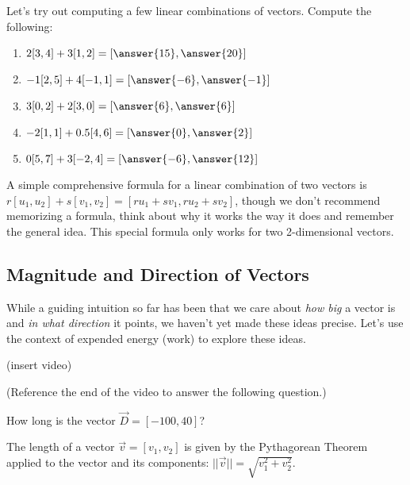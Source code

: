 \documentclass{ximera}
\begin{document}
\begin{problem}
    Let's try out computing a few linear combinations of vectors. Compute the following:
    \begin{enumerate}
        \item $2[3,4]+3[1,2]=[\answer{15},\answer{20}]$
        \item $-1[2,5]+4[-1,1]=[\answer{-6},\answer{-1}]$
        \item $3[0,2]+2[3,0]=[\answer{6},\answer{6}]$
        \item $-2[1,1]+0.5[4,6]=[\answer{0},\answer{2}]$
        \item $0[5,7]+3[-2,4]=[\answer{-6},\answer{12}]$
    \end{enumerate}

    \begin{feedback}
        A simple comprehensive formula for a linear combination of two vectors is $r[u_1,u_2]+s[v_1,v_2]=[ru_1+sv_1,ru_2+sv_2]$, though we don't recommend memorizing a formula, think about why it works the way it does and remember the general idea. This special formula only works for two 2-dimensional vectors.
    \end{feedback}
\end{problem}


\subsection*{Magnitude and Direction of Vectors}

While a guiding intuition so far has been that we care about \emph{how big} a vector is and \emph{in what direction} it points, we haven't yet made these ideas precise. Let's use the context of expended energy (work) to explore these ideas.

(insert video)

\begin{problem}
    (Reference the end of the video to answer the following question.)
    
    How long is the vector $\vec{D}=[-100,40]$? 

    \begin{selectAll}
    \end{selectAll}
    \begin{feedback}
        The length of a vector $\vec{v}=[v_1,v_2]$ is given by the Pythagorean Theorem applied to the vector and its components: $||\vec{v}||=\sqrt{v_1^2+v_2^2}$.
    \end{feedback}
\end{problem}
\end{document}
